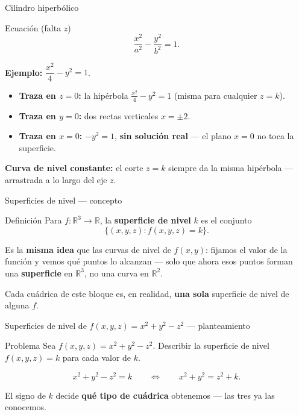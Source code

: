 \documentclass[11pt,aspectratio=169]{beamer}
\begin{document}
\begin{frame}{Cilindro hiperbólico}
  \begin{block}{Ecuación (falta $z$)}
    \[
      \frac{x^2}{a^2}-\frac{y^2}{b^2}=1.
    \]
  \end{block}
  \pause
  \textbf{Ejemplo:} $\dfrac{x^2}{4}-y^2=1$.
  \pause
  \begin{itemize}
    \item \textbf{Traza en $z=0$:} la hipérbola $\frac{x^2}{4}-y^2=1$ (misma para cualquier $z=k$).
    \pause
    \item \textbf{Traza en $y=0$:} dos rectas verticales $x=\pm2$.
    \pause
    \item \textbf{Traza en $x=0$:} $-y^2=1$, \textbf{sin solución real} --- el plano $x=0$ no toca la superficie.
  \end{itemize}
  \pause
  \begin{center}\normalsize\color{tealx}
  \textbf{Curva de nivel constante:} el corte $z=k$ siempre da la misma hipérbola --- arrastrada a lo largo del eje $z$.
  \end{center}
\end{frame}


\begin{frame}{Superficies de nivel --- concepto}
  \begin{block}{Definición}
    Para $f:\mathbb{R}^3\to\mathbb{R}$, la \textbf{superficie de nivel} $k$ es el conjunto
    \[
      \{(x,y,z) : f(x,y,z)=k\}.
    \]
  \end{block}
  \pause
  \begin{center}\normalsize\color{tealx}
  Es la \textbf{misma idea} que las curvas de nivel de $f(x,y)$: fijamos el valor de la función y vemos qué puntos lo alcanzan --- solo que ahora esos puntos forman una \textbf{superficie} en $\mathbb{R}^3$, no una curva en $\mathbb{R}^2$.
  \end{center}
  \pause
  \begin{center}\small\color{gray60}
  Cada cuádrica de este bloque es, en realidad, \textbf{una sola} superficie de nivel de alguna $f$.
  \end{center}
\end{frame}

\begin{frame}{Superficies de nivel de $f(x,y,z)=x^2+y^2-z^2$ --- planteamiento}
  \begin{block}{Problema}
    Sea $f(x,y,z)=x^2+y^2-z^2$. Describir la superficie de nivel $f(x,y,z)=k$ para cada valor de $k$.
  \end{block}
  \pause
  \[
    x^2+y^2-z^2=k \qquad\Longleftrightarrow\qquad x^2+y^2=z^2+k.
  \]
  \pause
  \begin{center}\normalsize
  El signo de $k$ decide \textbf{qué tipo de cuádrica} obtenemos --- las tres ya las conocemos.
  \end{center}
\end{frame}
\end{document}
